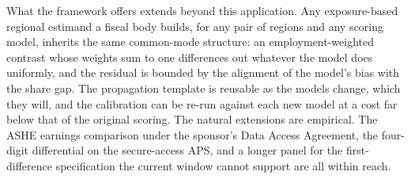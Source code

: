 What the framework offers extends beyond this application. Any exposure-based regional estimand a fiscal body builds, for any pair of regions and any scoring model, inherits the same common-mode structure: an employment-weighted contrast whose weights sum to one differences out whatever the model does uniformly, and the residual is bounded by the alignment of the model's bias with the share gap. The propagation template is reusable as the models change, which they will, and the calibration can be re-run against each new model at a cost far below that of the original scoring. The natural extensions are empirical. The ASHE earnings comparison under the sponsor's Data Access Agreement, the four-digit differential on the secure-access APS, and a longer panel for the first-difference specification the current window cannot support are all within reach.